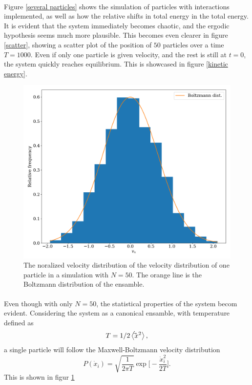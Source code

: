 \documentclass{article}
\begin{document}
        \paragraph*{}
        Figure \ref{several particles} shows the simulation of particles with interactions implemented, as well as how the relative shifts in total energy in the total energy. It is evident that the system immediately becomes chaotic, and the ergodic hypothesis seems much more plausible. This becomes even clearer in figure \ref{scatter}, showing a scatter plot of the position of $50$ particles over a time $T = 1000$. 
        Even if only one particle is given velocity, and the rest is still at $t = 0$, the system quickly reaches equilibrium. This is showcased in figure \ref{kinetic energy}. 

        \begin{figure}

            \centering
            \includegraphics[width = \textwidth]{vel_dist}
            \caption{The noralized velocity distribution of the velocity distribution of one particle in a simulation with $N = 50$. The orange line is the Boltzmann distribution of the ensamble.}
            \label{velocity dist}

        \end{figure}

        \paragraph*{}
        Even though with only $N=50$, the statistical properties of the system becom evident. Considering the system as a canonical ensamble, with temperature defined as
        \begin{equation*}
            T = 1/2 \expval{\dot \vec x^2},
        \end{equation*}
        a single particle will follow the Maxwell-Boltzmann velocity distribution
        \begin{equation*}
            P(\dot x_i) = \sqrt{\frac{1}{2\pi T}}\exp \bigg[ -\frac{\dot x_i^2}{2T}\bigg].
        \end{equation*}
        This is shown in figur \ref{velocity dist}
\end{document}
